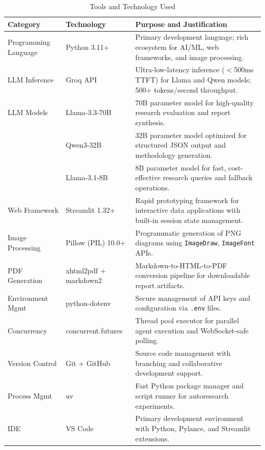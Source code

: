 \begin{table}[H]
\centering
\caption{Tools and Technology Used}
\label{tab:tools}
\begin{tabularx}{\textwidth}{|l|l|X|}
\hline
\textbf{Category} & \textbf{Technology} & \textbf{Purpose and Justification} \\
\hline
Programming Language & Python 3.11+ & Primary development language; rich ecosystem for AI/ML, web frameworks, and image processing. \\
\hline
LLM Inference & Groq API & Ultra-low-latency inference ($<$500ms TTFT) for Llama and Qwen models; 500+ tokens/second throughput. \\
\hline
LLM Models & Llama-3.3-70B & 70B parameter model for high-quality research evaluation and report synthesis. \\
\hline
 & Qwen3-32B & 32B parameter model optimized for structured JSON output and methodology generation. \\
\hline
 & Llama-3.1-8B & 8B parameter model for fast, cost-effective research queries and fallback operations. \\
\hline
Web Framework & Streamlit 1.32+ & Rapid prototyping framework for interactive data applications with built-in session state management. \\
\hline
Image Processing & Pillow (PIL) 10.0+ & Programmatic generation of PNG diagrams using \texttt{ImageDraw}, \texttt{ImageFont} APIs. \\
\hline
PDF Generation & xhtml2pdf + markdown2 & Markdown-to-HTML-to-PDF conversion pipeline for downloadable report artifacts. \\
\hline
Environment Mgmt & python-dotenv & Secure management of API keys and configuration via \texttt{.env} files. \\
\hline
Concurrency & concurrent.futures & Thread pool executor for parallel agent execution and WebSocket-safe polling. \\
\hline
Version Control & Git + GitHub & Source code management with branching and collaborative development support. \\
\hline
Process Mgmt & uv & Fast Python package manager and script runner for autoresearch experiments. \\
\hline
IDE & VS Code & Primary development environment with Python, Pylance, and Streamlit extensions. \\
\hline
\end{tabularx}
\end{table}
